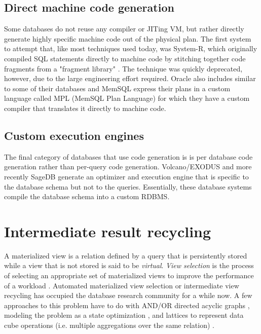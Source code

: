 \subsection{Direct machine code generation}

Some databases do not reuse any compiler or JITing VM, but rather
directly generate highly specific machine code out of the physical
plan. The first system to attempt that, like most techniques used
today, was System-R, which originally compiled SQL statements directly
to machine code by stitching together code fragments from a "fragment
library" \cite{chamberlinHistoryEvaluationSystem1981}. The technique was
quickly deprecated, however, due to the large engineering effort
required. Oracle also includes similar to some of their databases and
MemSQL express their plans in a custom language called MPL (MemSQL
Plan Language) for which they have a custom compiler that translates
it directly to machine code.

\subsection{Custom execution engines}

The final category of databases that use code generation is is per database 
code generation rather than per-query code generation. Volcano/EXODUS
\cite{graefeVolcanoOptimizerGenerator1993a} and more recently SageDB
\cite{kraskaSageDBLearnedDatabase} generate an optimizer and execution
engine that is specific to the database schema but not to the queries.
Essentially, these database systems compile the database schema into a 
custom RDBMS. 

\section{Intermediate result recycling}

A materialized view is a relation defined by a query that is
persistently stored while a view that is not stored is said to be
\emph{virtual}. \emph{View selection} is the process of selecting an
appropriate set of materialized views to improve the performance of a
workload \cite{mamiSurveyViewSelection2012}.  Automated materialized
view selection or intermediate view recycling has occupied
the database research community for a while now. A few approaches to
this problem have to do with AND/OR directed acyclic graphs
\cite{guptaSelectionViewsMaterialize1997}, modeling the problem as a
state optimization \cite{theodoratosDataWarehouseConfiguration1997},
and lattices to represent data cube operations (i.e. multiple
aggregations over the same relation) \cite{ImplementingDataCubes}.

